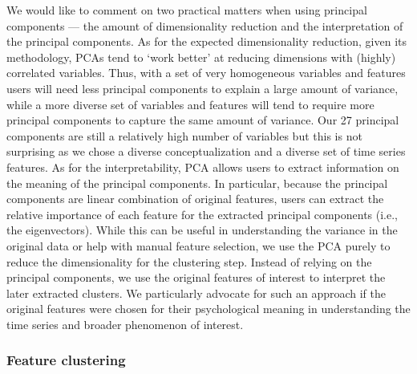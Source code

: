 We would like to comment on two practical matters when using principal
components --- the amount of dimensionality reduction and the
interpretation of the principal components. As for the expected
dimensionality reduction, given its methodology, PCAs tend to `work
better' at reducing dimensions with (highly) correlated variables. Thus,
with a set of very homogeneous variables and features users will need
less principal components to explain a large amount of variance, while a
more diverse set of variables and features will tend to require more
principal components to capture the same amount of variance. Our 27
principal components are still a relatively high number of variables but
this is not surprising as we chose a diverse conceptualization and a
diverse set of time series features. As for the interpretability, PCA
allows users to extract information on the meaning of the principal
components. In particular, because the principal components are linear
combination of original features, users can extract the relative
importance of each feature for the extracted principal components (i.e.,
the eigenvectors). While this can be useful in understanding the
variance in the original data or help with manual feature selection, we
use the PCA purely to reduce the dimensionality for the clustering step.
Instead of relying on the principal components, we use the original
features of interest to interpret the later extracted clusters. We
particularly advocate for such an approach if the original features were
chosen for their psychological meaning in understanding the time series
and broader phenomenon of interest.

\subsubsection{Feature clustering}


